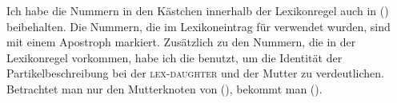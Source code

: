 \zs

\noindent
Ich habe die Nummern in den Kästchen innerhalb der Lexikonregel auch in ()
beibehalten.
Die Nummern, die im Lexikoneintrag für  verwendet wurden, sind mit einem Apostroph markiert.
Zusätzlich zu den Nummern, die in der Lexikonregel vorkommen, habe ich die  benutzt,
um die Identität der Partikelbeschreibung bei der \textsc{lex-daughter} und der Mutter zu verdeutlichen.
Betrachtet man nur den Mutterknoten von (), bekommt man ().

